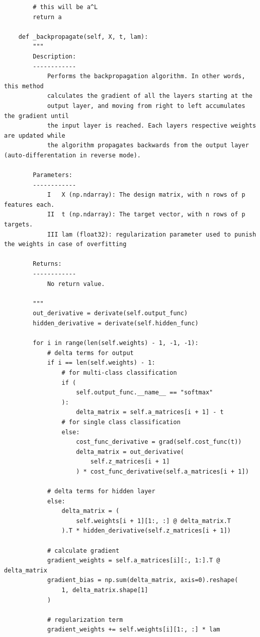 \documentclass{beamer}
\begin{document}
\begin{frame}
\begin{verbatim}
        # this will be a^L
        return a

    def _backpropagate(self, X, t, lam):
        """
        Description:
        ------------
            Performs the backpropagation algorithm. In other words, this method
            calculates the gradient of all the layers starting at the
            output layer, and moving from right to left accumulates the gradient until
            the input layer is reached. Each layers respective weights are updated while
            the algorithm propagates backwards from the output layer (auto-differentation in reverse mode).

        Parameters:
        ------------
            I   X (np.ndarray): The design matrix, with n rows of p features each.
            II  t (np.ndarray): The target vector, with n rows of p targets.
            III lam (float32): regularization parameter used to punish the weights in case of overfitting

        Returns:
        ------------
            No return value.

        """
        out_derivative = derivate(self.output_func)
        hidden_derivative = derivate(self.hidden_func)

        for i in range(len(self.weights) - 1, -1, -1):
            # delta terms for output
            if i == len(self.weights) - 1:
                # for multi-class classification
                if (
                    self.output_func.__name__ == "softmax"
                ):
                    delta_matrix = self.a_matrices[i + 1] - t
                # for single class classification
                else:
                    cost_func_derivative = grad(self.cost_func(t))
                    delta_matrix = out_derivative(
                        self.z_matrices[i + 1]
                    ) * cost_func_derivative(self.a_matrices[i + 1])

            # delta terms for hidden layer
            else:
                delta_matrix = (
                    self.weights[i + 1][1:, :] @ delta_matrix.T
                ).T * hidden_derivative(self.z_matrices[i + 1])

            # calculate gradient
            gradient_weights = self.a_matrices[i][:, 1:].T @ delta_matrix
            gradient_bias = np.sum(delta_matrix, axis=0).reshape(
                1, delta_matrix.shape[1]
            )

            # regularization term
            gradient_weights += self.weights[i][1:, :] * lam


\end{verbatim}
\end{frame}
\end{document}
